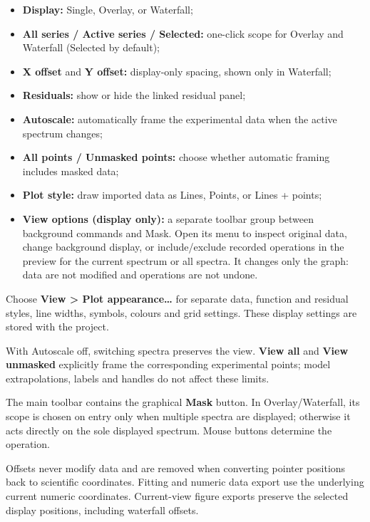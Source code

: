 \documentclass[
  10pt,
  a4paper,
  oneside]{scrreprt}
\providecommand{\tightlist}{%
  \setlength{\itemsep}{0pt}\setlength{\parskip}{0pt}}
\begin{document}
\begin{itemize}
\tightlist
\item
  \textbf{Display:} Single, Overlay, or Waterfall;
\item
  \textbf{All series / Active series / Selected:} one-click scope for
  Overlay and Waterfall (Selected by default);
\item
  \textbf{X offset} and \textbf{Y offset:} display-only spacing, shown
  only in Waterfall;
\item
  \textbf{Residuals:} show or hide the linked residual panel;
\item
  \textbf{Autoscale:} automatically frame the experimental data when the
  active spectrum changes;
\item
  \textbf{All points / Unmasked points:} choose whether automatic
  framing includes masked data;
\item
  \textbf{Plot style:} draw imported data as Lines, Points, or Lines +
  points;
\item
  \textbf{View options (display only):} a separate toolbar group between
  background commands and Mask. Open its menu to inspect original data,
  change background display, or include/exclude recorded operations in
  the preview for the current spectrum or all spectra. It changes only
  the graph: data are not modified and operations are not undone.
\end{itemize}

Choose \textbf{View \textgreater{} Plot appearance\ldots{}} for separate
data, function and residual styles, line widths, symbols, colours and
grid settings. These display settings are stored with the project.

With Autoscale off, switching spectra preserves the view. \textbf{View
all} and \textbf{View unmasked} explicitly frame the corresponding
experimental points; model extrapolations, labels and handles do not
affect these limits.

The main toolbar contains the graphical \textbf{Mask} button. In
Overlay/Waterfall, its scope is chosen on entry only when multiple
spectra are displayed; otherwise it acts directly on the sole displayed
spectrum. Mouse buttons determine the operation.

Offsets never modify data and are removed when converting pointer
positions back to scientific coordinates. Fitting and numeric data
export use the underlying current numeric coordinates. Current-view
figure exports preserve the selected display positions, including
waterfall offsets.
\end{document}
